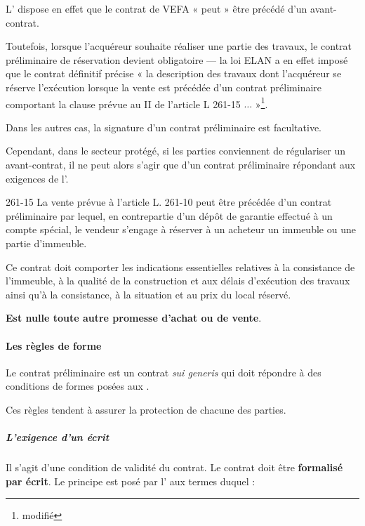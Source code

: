 			L’ dispose en effet que le contrat de VEFA « peut » être précédé d’un avant-contrat.

			Toutefois, lorsque l’acquéreur souhaite réaliser une partie des travaux, le contrat préliminaire de réservation devient obligatoire --- la loi ELAN a en effet imposé que le contrat définitif précise « la description des travaux dont l’acquéreur se réserve l’exécution lorsque la vente est précédée d’un contrat préliminaire comportant la clause prévue au II de l’article L 261-15 $\dots$ »\footnote{ modifié}.

			Dans les autres cas, la signature d’un contrat préliminaire est facultative.

			Cependant, dans le secteur protégé, si les parties conviennent de régulariser un avant-contrat, il ne peut alors s’agir que d’un contrat préliminaire répondant aux exigences de l’.

			\begin{citationArticle}[L]{261-15}{\cch}
				La vente prévue à l'article L. 261-10 peut être précédée d'un contrat préliminaire par lequel, en contrepartie d'un dépôt de garantie effectué à un compte spécial, le vendeur s'engage à réserver à un acheteur un immeuble ou une partie d'immeuble.

				Ce contrat doit comporter les indications essentielles relatives à la consistance de l'immeuble, à la qualité de la construction et aux délais d'exécution des travaux ainsi qu'à la consistance, à la situation et au prix du local réservé.

				\lips

				\textbf{Est nulle toute autre promesse d'achat ou de vente}.
			\end{citationArticle}


			\paragraph{Les règles de forme}

				Le contrat préliminaire est un contrat \emph{sui generis} qui doit répondre à des conditions de formes posées aux .

				Ces règles tendent à assurer la protection de chacune des parties.

				\subparagraph{L'exigence d'un écrit}

					Il s’agit d’une condition de validité du contrat. Le contrat doit être \textbf{formalisé par écrit}.
					Le principe est posé par l’ aux termes duquel :

